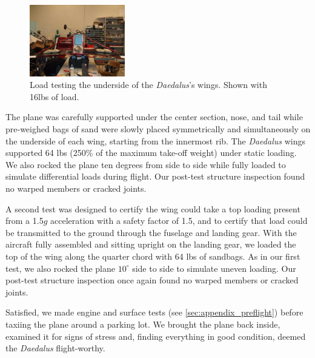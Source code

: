\documentclass[10pt]{report}
\newcommand{\degrees}[1]
{
\begin{math}
#1^{\circ} 
\end{math}
}
\begin{document}
 \begin{figure}
	\includegraphics[width=0.37\textwidth]{../images/daedalus_sandbagtest.jpg}
	\caption{Load testing the underside of the \emph{Daedalus}'s wings. Shown with 16lbs of load.}
	\label{fig:sandbagtest}
\end{figure}
The plane was carefully supported under the center section, nose, and tail while pre-weighed bags of sand were slowly placed symmetrically and simultaneously on the underside of each wing, starting from the innermost rib.  The \emph{Daedalus} wings supported 64 lbs (250\% of the maximum take-off weight) under static loading.  We also rocked the plane ten degrees from side to side while fully loaded to simulate differential loads during flight. Our post-test structure inspection found no warped members or cracked joints.

A second test was designed to certify the wing could take a top loading present from a 1.5$g$ acceleration with a safety factor of 1.5, and to certify that load could be transmitted to the ground through the fuselage and landing gear. With the aircraft fully assembled and sitting upright on the landing gear, we loaded the top of the wing along the quarter chord with 64 lbs of sandbags. As in our first test, we also rocked the plane \degrees{10} side to side to simulate uneven loading. Our post-test structure inspection once again found no warped members or cracked joints.

Satisfied, we made engine and surface tests (see \ref{sec:appendix_preflight}) before taxiing the plane around a parking lot.  We brought the plane back inside, examined it for signs of stress and, finding everything in good condition, deemed the \emph{Daedalus} flight-worthy.
\end{document}
